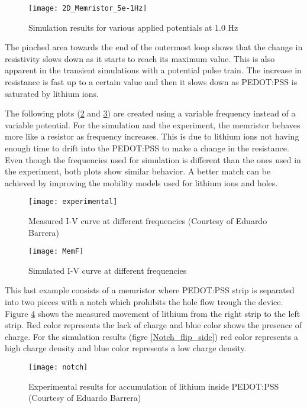 \begin{doublespace}
\begin{figure}[!htp]
\centering
\texttt{[image: 2D\_Memristor\_5e-1Hz]}
\caption{Simulation results for various applied potentials at 1.0 Hz} 
\label{2D_Memristor_5e-1Hz}
\end{figure}

The pinched area towards the end of the outermost loop shows that the change in resistivity slows down as it starts to reach its maximum value. This is also apparent in the transient simulations with a potential pulse train. The increase in resistance is fast up to a certain value and then it slows down as PEDOT:PSS is saturated by lithium ions.

The following plots (\ref{experimental} and \ref{MemF}) are created using a variable frequency instead of a variable potential. For the simulation and the experiment, the memristor behaves more like a resistor as frequency increases. This is due to lithium ions not having enough time to drift into the PEDOT:PSS to make a change in the resistance. Even though the frequencies used for simulation is different than the ones used in the experiment, both plots show similar behavior. A better match can be achieved by improving the mobility models used for lithium ions and holes. 

\begin{figure}[!htp]
\centering
\texttt{[image: experimental]}
\caption{Measured I-V curve at different frequencies (Courtesy of Eduardo Barrera)\cite{eduardo}} 
\label{experimental}
\end{figure}

\begin{figure}[!htp]
\centering
\texttt{[image: MemF]}
\caption{Simulated I-V curve at different frequencies } 
\label{MemF}
\end{figure}

\clearpage
This last example consists of a memristor where PEDOT:PSS strip is separated into two pieces with a notch which prohibits the hole flow trough the device. Figure \ref{notch} shows the measured movement of lithium from the right strip to the left strip. Red color represents the lack of charge and blue color shows the presence of charge. For the simulation results (figre \ref{Notch_flip_side}) red color represents a high charge density and blue color represents a low charge density.

\begin{figure}[!htp]
\centering
\texttt{[image: notch]}
\caption{Experimental results for accumulation of lithium inside PEDOT:PSS (Courtesy of Eduardo Barrera)} 
\label{notch}
\end{figure}


\end{doublespace}
